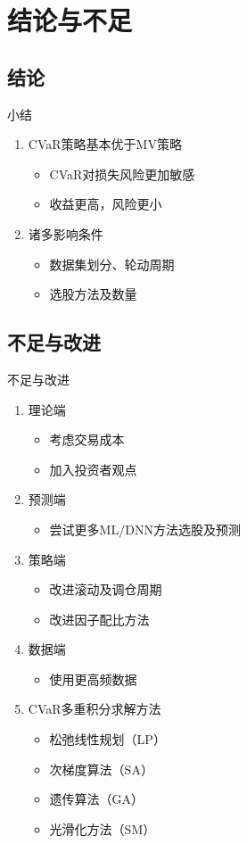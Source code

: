 \documentclass[CJK,aspectratio=43]{beamer}  %
\begin{document}
\section{结论与不足}
\subsection{结论}
\begin{frame}{小结}
	\begin{enumerate}
	\item CVaR策略基本优于MV策略
		\begin{itemize}
			\item CVaR对损失风险更加敏感
			\item 收益更高，风险更小
		\end{itemize}
	\item 诸多影响条件
		\begin{itemize}
			\item 数据集划分、轮动周期
			\item 选股方法及数量
		\end{itemize}
	\end{enumerate}
\end{frame}

\subsection{不足与改进}
\begin{frame}{不足与改进}
	\begin{enumerate}
		\item 理论端
		\begin{itemize}
			\item 考虑交易成本
			\item 加入投资者观点
		\end{itemize}
		\item  预测端
		\begin{itemize}
			\item 尝试更多ML/DNN方法选股及预测
		\end{itemize}
		\item  策略端
		\begin{itemize}
			\item 改进滚动及调仓周期
			\item 改进因子配比方法
		\end{itemize}
		\item  数据端
		\begin{itemize}
			\item 使用更高频数据
		\end{itemize}
		\item  CVaR多重积分求解方法
		\begin{itemize}
			\item 松弛线性规划（LP）
			\item 次梯度算法（SA）
			\item 遗传算法（GA）
			\item 光滑化方法（SM）
		\end{itemize}
	\end{enumerate}
\end{frame}
\end{document}
